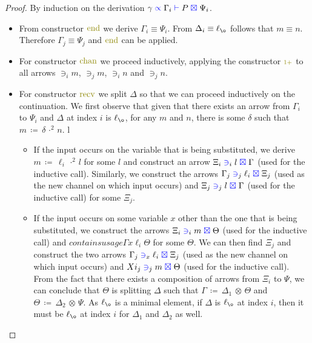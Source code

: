 \documentclass[a4paper,UKenglish,cleveref, autoref, thm-restate,authorcolumns]{lipics-v2019}
\theoremstyle{definition}
\newcommand{\type}[1]{\textcolor{blue}{\operatorname{#1}}}
\newcommand{\constr}[1]{\textcolor{olive}{\operatorname{#1}}}
\newcommand{\suc}{\constr{\scriptstyle 1+}}
\newcommand{\opsquared}[3]{#1 \, \coloneqq \, #2 \, \cdot^2 \, #3}
\newcommand{\opctx}[3]{#1 \, \coloneqq \, #2 \, \otimes \, #3}
\newcommand{\types}[4]{#1 \; \type{\propto} \; #2 \; \type{\vdash} \; #3 \; \type{\boxtimes} \; #4}
\newcommand{\containsusage}[4]{#1 \; \type{\ni}_{#2} \; #3 \; \type{\boxtimes} \; #4}
\begin{document}
\begin{proof}
  By induction on the derivation $\types{\gamma}{\Gamma_i}{P}{\Psi_i}$.
  \begin{itemize}
    \item
      From constructor $\constr{end}$ we derive $\Gamma_i \equiv \Psi_i$.
      From $\Delta_i \equiv \ell_{\o}$ follows that $m \equiv n$.
      Therefore $\Gamma_j \equiv \Psi_j$ and $\constr{end}$ can be applied.

    \item
      For constructor $\constr{chan}$ we proceed inductively, applying the constructor $\suc$ to all arrows $\ni_i m$, $\ni_j m$, $\ni_i n$ and $\ni_j n$.
      
    \item
      For constructor $\constr{recv}$ we split $\Delta$ so that we can proceed inductively on the continuation.
      We first observe that given that there exists an arrow from $\Gamma_i$ to $\Psi_i$ and $\Delta$ at index $i$ is $\ell_{\o}$, for any $m$ and $n$, there is some $\delta$ such that $\opsquared{m}{\delta}{n}$.
 l     \begin{itemize}
        \item
          If the input occurs on the variable that is being substituted, we derive $\opsquared{m}{\ell_i}{l}$ for some $l$ and construct an arrow $\containsusage{\Xi_i}{i}{l}{\Gamma}$ (used for the inductive call).
          Similarly, we construct the arrows $\containsusage{\Gamma_j}{j}{\ell_i}{\Xi_j}$ (used as the new channel on which input occurs) and $\containsusage{\Xi_j}{j}{l}{\Gamma}$ (used for the inductive call) for some $\Xi_j$.
        \item
          If the input occurs on some variable $x$ other than the one that is being substituted, we construct the arrows $\containsusage{\Xi_i}{i}{m}{\Theta}$ (used for the inductive call) and $containsusage{\Gamma}{x}{\ell_i}{\Theta}$ for some $\Theta$.
          We can then find $\Xi_j$ and construct the two arrows $\containsusage{\Gamma_j}{x}{\ell_i}{\Xi_j}$ (used as the new channel on which input occurs) and $\containsusage{Xi_j}{j}{m}{\Theta}$ (used for the inductive call).
          From the fact that there exists a composition of arrows from $\Xi_i$ to $\Psi$, we can conclude that $\Theta$ is splitting $\Delta$ such that $\opctx{\Gamma}{\Delta_1}{\Theta}$ and $\opctx{\Theta}{\Delta_2}{\Psi}$.
          As $\ell_{\o}$ is a minimal element, if $\Delta$ is $\ell_{\o}$ at index $i$, then it must be $\ell_{\o}$ at index $i$ for $\Delta_1$ and $\Delta_2$ as well.
      \end{itemize}


\end{itemize}
\end{proof}
\end{document}

